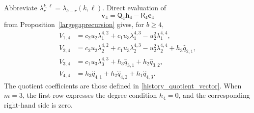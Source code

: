 \documentclass[10pt,a4paper]{amsart}
\begin{document}
Abbreviate $\lambda_r^{k,\ell}=\lambda_{b-r}(k,\ell)$.  Direct
evaluation of
\[
 \mathbf v_4=\mathsf Q_4\mathbf h_4-\mathsf R_4\mathbf c_4
\]
from Proposition~\ref{largegaprecursion} gives, for $b\ge4$,
\begin{equation}\label{fourth_rhs}
\begin{aligned}
 V_{1,4}&=c_2u_2\lambda_1^{4,2}
                   +c_1u_3\lambda_1^{4,3}-u_2^2\lambda_1^{4,4},\\
 V_{2,4}&=c_2u_2\lambda_2^{4,2}
                   +c_1u_3\lambda_2^{4,3}-u_2^2\lambda_2^{4,4}
                   +h_3\widehat q_{2,1},\\
 V_{3,4}&=c_1u_3\lambda_3^{4,3}
                   +h_3\widehat q_{3,1}+h_2\widehat q_{3,2},\\
 V_{4,4}&=h_3\widehat q_{4,1}+h_2\widehat q_{4,2}
                                  +h_1\widehat q_{4,3}.
\end{aligned}
\end{equation}
The quotient coefficients are those defined in
\eqref{history_quotient_vector}.  When $m=3$, the first row expresses the degree condition $h_4=0$,
and the corresponding right-hand side is zero.
\end{document}

